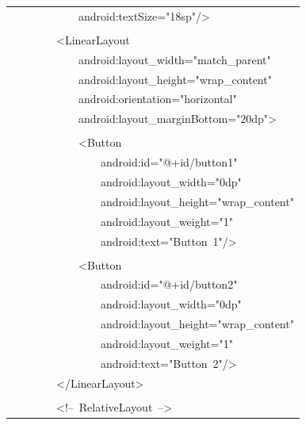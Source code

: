 \documentclass[a4paper,12pt]{article}
\begin{document}
\begin{longtable}{|p{}|}
{\ttfamily\small \ \ \ \ \ \ \ \ \ \ \ \ android:textSize="18sp"/\textgreater{}} \\
\strut \\
{\ttfamily\small \ \ \ \ \ \ \ \ \textless{}LinearLayout} \\
{\ttfamily\small \ \ \ \ \ \ \ \ \ \ \ \ android:layout\_width="match\_parent"} \\
{\ttfamily\small \ \ \ \ \ \ \ \ \ \ \ \ android:layout\_height="wrap\_content"} \\
{\ttfamily\small \ \ \ \ \ \ \ \ \ \ \ \ android:orientation="horizontal"} \\
{\ttfamily\small \ \ \ \ \ \ \ \ \ \ \ \ android:layout\_marginBottom="20dp"\textgreater{}} \\
\strut \\
{\ttfamily\small \ \ \ \ \ \ \ \ \ \ \ \ \textless{}Button} \\
{\ttfamily\small \ \ \ \ \ \ \ \ \ \ \ \ \ \ \ \ android:id="@+id/button1"} \\
{\ttfamily\small \ \ \ \ \ \ \ \ \ \ \ \ \ \ \ \ android:layout\_width="0dp"} \\
{\ttfamily\small \ \ \ \ \ \ \ \ \ \ \ \ \ \ \ \ android:layout\_height="wrap\_content"} \\
{\ttfamily\small \ \ \ \ \ \ \ \ \ \ \ \ \ \ \ \ android:layout\_weight="1"} \\
{\ttfamily\small \ \ \ \ \ \ \ \ \ \ \ \ \ \ \ \ android:text="Button\ 1"/\textgreater{}} \\
\strut \\
{\ttfamily\small \ \ \ \ \ \ \ \ \ \ \ \ \textless{}Button} \\
{\ttfamily\small \ \ \ \ \ \ \ \ \ \ \ \ \ \ \ \ android:id="@+id/button2"} \\
{\ttfamily\small \ \ \ \ \ \ \ \ \ \ \ \ \ \ \ \ android:layout\_width="0dp"} \\
{\ttfamily\small \ \ \ \ \ \ \ \ \ \ \ \ \ \ \ \ android:layout\_height="wrap\_content"} \\
{\ttfamily\small \ \ \ \ \ \ \ \ \ \ \ \ \ \ \ \ android:layout\_weight="1"} \\
{\ttfamily\small \ \ \ \ \ \ \ \ \ \ \ \ \ \ \ \ android:text="Button\ 2"/\textgreater{}} \\
{\ttfamily\small \ \ \ \ \ \ \ \ \textless{}/LinearLayout\textgreater{}} \\
\strut \\
{\ttfamily\small \ \ \ \ \ \ \ \ \textless{}!--\ RelativeLayout\ --\textgreater{}} \\

\end{longtable}
\end{document}
